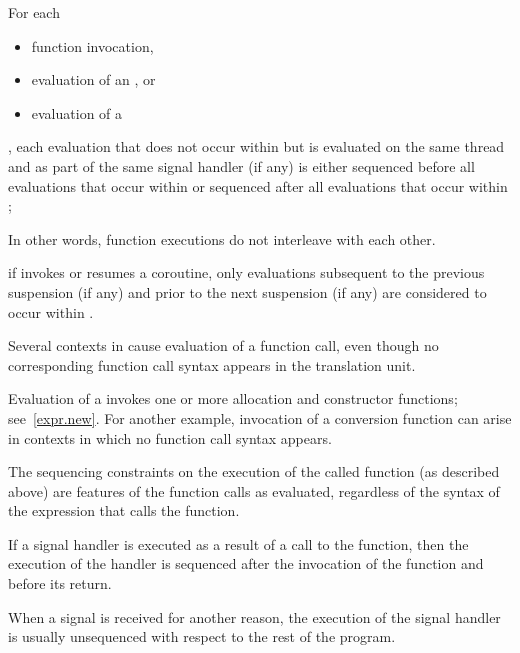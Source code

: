 \pnum
For each
\begin{itemize}
\item function invocation,
\item evaluation of an , or
\item evaluation of a 
\end{itemize}
,
each evaluation that does not occur within 
but is evaluated on the same thread and as part of the same signal handler (if any)
is either sequenced before all evaluations that occur within 
or sequenced after all evaluations that occur within ;
\begin{footnote}
In other words,
function executions do not interleave with each other.
\end{footnote}
if  invokes or resumes a coroutine,
only evaluations
subsequent to the previous suspension (if any) and
prior to the next suspension (if any)
are considered to occur within .

\pnum
Several contexts in \Cpp{} cause evaluation of a function call, even
though no corresponding function call syntax appears in the translation
unit.
\begin{example}
Evaluation of a  invokes one or more allocation
and constructor functions; see~\ref{expr.new}. For another example,
invocation of a conversion function can arise in
contexts in which no function call syntax appears.
\end{example}

\pnum
The sequencing constraints on the execution of the called function (as
described above) are features of the function calls as evaluated,
regardless of the syntax of the expression that calls the function.%
%

%
%
\pnum
If a signal handler is executed as a result of a call to the 
function, then the execution of the handler is sequenced after the invocation
of the  function and before its return.
\begin{note}
When a signal is received for another reason, the execution of the
signal handler is usually unsequenced with respect to the rest of the program.
\end{note}

